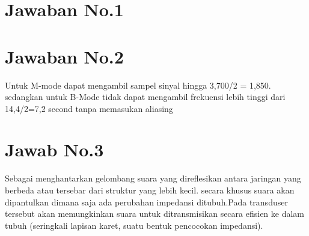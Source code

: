 \section{Jawaban No.1}


\section{Jawaban No.2}
Untuk M-mode dapat mengambil sampel sinyal hingga 3,700/2 = 1,850. sedangkan untuk B-Mode tidak dapat mengambil frekuensi lebih tinggi dari 14,4/2=7,2 second tanpa memasukan aliasing

\section{Jawab No.3}
Sebagai menghantarkan gelombang suara yang direflesikan antara jaringan yang berbeda atau tersebar dari struktur yang lebih kecil. secara khusus suara akan dipantulkan dimana saja ada perubahan impedansi ditubuh.Pada transduser tersebut akan memungkinkan suara untuk ditransmisikan secara efisien ke dalam tubuh (seringkali lapisan karet, suatu bentuk pencocokan impedansi).
